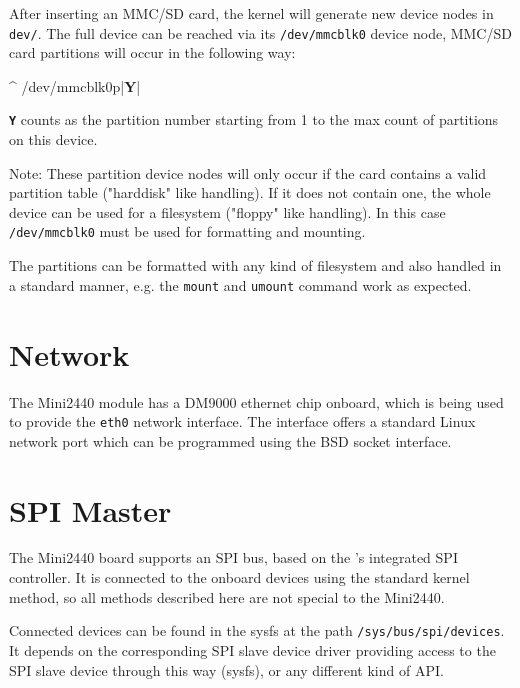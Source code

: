 After inserting an MMC/SD card, the kernel will generate new device nodes in
\texttt{dev/}. The full device can be reached via its \texttt{/dev/mmcblk0}
device node, MMC/SD card partitions will occur in the following way:

\begin{ptxshell}[escapechar=|]{^}
/dev/mmcblk0p|\textbf{Y}|
\end{ptxshell}
\texttt{\textbf{Y}} counts as the partition number starting from 1 to the max
count of partitions on this device.

Note: These partition device nodes will only occur if the card contains a
valid partition table ("harddisk" like handling). If it does not contain one,
the whole device can be used for a filesystem ("floppy" like handling). In
this case \texttt{/dev/mmcblk0} must be used for formatting and mounting.

The partitions can be formatted with any kind of filesystem and also handled in
a standard manner, e.g. the \texttt{mount} and \texttt{umount} command work as
expected.


\newcommand{\perNetworkChip}{ DM9000}
\newcommand{\perNetworkInterface}{eth0}

\section{Network}				\label{sec:NET}

The Mini2440 module has a\perNetworkChip{} ethernet chip onboard,
which is being used to provide the \texttt{\perNetworkInterface{}} network
interface. The interface offers a standard Linux network port which can be
programmed using the BSD socket interface.


\section{SPI Master}				\label{sec:SPI}

The Mini2440 board supports an SPI bus, based on the \perCpuName 's
integrated SPI controller. It is connected to the onboard devices using the
standard kernel method, so all methods described here are not special to the
Mini2440.

Connected devices can be found in the sysfs at the path
\texttt{/sys/bus/spi/devices}. It depends on the corresponding SPI slave device
driver providing access to the SPI slave device through this way (sysfs),
or any different kind of API.


